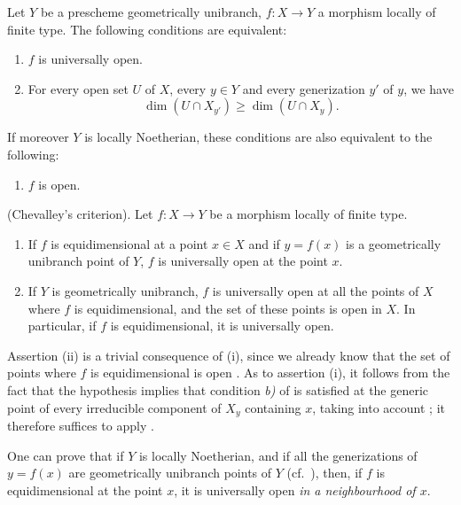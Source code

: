 \begin{corollary}[14.4.3]
\label{IV.14.4.3}
Let $Y$ be a prescheme geometrically unibranch, $f:X\to Y$ a morphism locally of finite type.
The following conditions are equivalent:
\begin{enumerate}[label=\emph{\alph*)}]
  \item $f$ is universally open.
  \item For every open set $U$ of $X$, every $y\in Y$ and every generization $y'$ of $y$, we have
    \[
      \dim(U\cap X_{y'})\geq\dim(U\cap X_y).
    \]
\end{enumerate}
If moreover $Y$ is locally Noetherian, these conditions are also equivalent to the following:
\begin{enumerate}[label=\emph{\alph*)}]
  \item[\emph{c)}] $f$ is open.
\end{enumerate}
\end{corollary}

\begin{corollary}[14.4.4]
\label{IV.14.4.4}
(Chevalley's criterion).
Let $f:X\to Y$ be a morphism locally of finite type.
\begin{enumerate}[label=(\roman*)]
  \item If $f$ is equidimensional at a point $x\in X$  and if $y=f(x)$ is a geometrically unibranch point of $Y$, $f$ is universally open at the point $x$.
  \item If $Y$ is geometrically unibranch, $f$ is universally open at all the points of $X$ where $f$ is equidimensional, and the set of these points is open in $X$.
In particular, if $f$ is equidimensional, it is universally open.
\end{enumerate}
\end{corollary}

Assertion (ii) is a trivial consequence of (i), since we already know that the set of points where $f$ is equidimensional is open .
As to assertion (i), it follows from the fact that the hypothesis implies that condition \emph{b)} of  is satisfied at the generic point of every irreducible component of $X_y$ containing $x$, taking into account ; it therefore suffices to apply .

\begin{remark}[14.4.5]
\label{IV.14.4.5}
One can prove that if $Y$ is locally Noetherian, and if all the generizations of $y=f(x)$ are geometrically unibranch points of $Y$ (cf.\ ), then, if $f$ is equidimensional at the point $x$, it is universally open \emph{in a neighbourhood of $x$}.
\end{remark}

